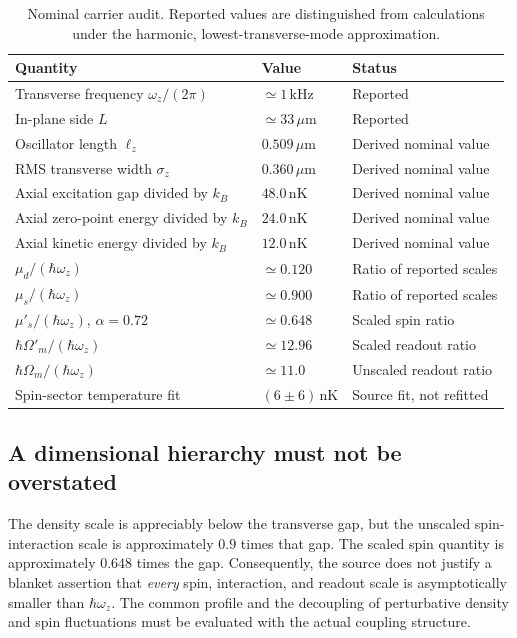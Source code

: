 \documentclass[11pt,a4paper]{article}
\theoremstyle{definition}
\theoremstyle{remark}
\newcommand{\musp}{\mu'_s}
\newcommand{\lop}{\ell_z}
\begin{document}
\begin{table}[htbp]
\centering\small
\caption{Nominal carrier audit. Reported values are distinguished from calculations under the harmonic, lowest-transverse-mode approximation.}
\label{tab:scales}
\begin{tabular}{@{}L{0.40\textwidth}L{0.22\textwidth}L{0.29\textwidth}@{}}
\toprule Quantity & Value & Status\\\midrule
Transverse frequency $\omega_z/(2\pi)$ & $\simeq1\,\mathrm{kHz}$ & Reported\cite{zhang2026}\\
In-plane side $L$ & $\simeq33\,\mu\mathrm m$ & Reported\cite{zhang2026}\\
Oscillator length $\lop$ & $0.509\,\mu\mathrm m$ & Derived nominal value\\
RMS transverse width $\sigma_z$ & $0.360\,\mu\mathrm m$ & Derived nominal value\\
Axial excitation gap divided by $k_B$ & $48.0\,\mathrm{nK}$ & Derived nominal value\\
Axial zero-point energy divided by $k_B$ & $24.0\,\mathrm{nK}$ & Derived nominal value\\
Axial kinetic energy divided by $k_B$ & $12.0\,\mathrm{nK}$ & Derived nominal value\\
$\mu_d/(\hbar\omega_z)$ & $\simeq0.120$ & Ratio of reported scales\\
$\mu_s/(\hbar\omega_z)$ & $\simeq0.900$ & Ratio of reported scales\\
$\musp/(\hbar\omega_z)$, $\alpha=0.72$ & $\simeq0.648$ & Scaled spin ratio\\
$\hbar\Omega'_m/(\hbar\omega_z)$ & $\simeq12.96$ & Scaled readout ratio\cite{zhang2026}\\
$\hbar\Omega_m/(\hbar\omega_z)$ & $\simeq11.0$ & Unscaled readout ratio\\
Spin-sector temperature fit & $(6\pm6)\,\mathrm{nK}$ & Source fit, not refitted\\
\bottomrule
\end{tabular}
\end{table}

\subsection{A dimensional hierarchy must not be overstated}
\label{sec:readout_hierarchy}
The density scale is appreciably below the transverse gap, but the unscaled spin-interaction scale is approximately $0.9$ times that gap. The scaled spin quantity is approximately $0.648$ times the gap. Consequently, the source does not justify a blanket assertion that \emph{every} spin, interaction, and readout scale is asymptotically smaller than $\hbar\omega_z$. The common profile and the decoupling of perturbative density and spin fluctuations must be evaluated with the actual coupling structure.\cite{zhang2026,precursor}
\end{document}
